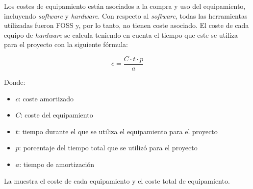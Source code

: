 Los costes de equipamiento están asociados a la compra y uso del equipamiento,
incluyendo \textit{software} y \textit{hardware}. Con respecto al
\textit{software}, todas las herramientas utilizadas fueron \gls{FOSS} y, por lo
tanto, no tienen coste asociado. El coste de cada equipo de \textit{hardware}
se calcula teniendo en cuenta el tiempo que este se utiliza para el proyecto con
la siguiente fórmula:

\begin{equation}\label{eq:chargeable-cost}
    c = \frac{C \cdot t \cdot p}{a}
\end{equation}

\noindent
Donde:

\begin{itemize}
    \item $c$: coste amortizado
    \item $C$: coste del equipamiento
    \item $t$: tiempo durante el que se utiliza el equipamiento para el proyecto
    \item $p$: porcentaje del tiempo total que se utilizó para el proyecto
    \item $a$: tiempo de amortización
\end{itemize}

\noindent
La  muestra el coste de cada equipamiento y el coste total
de equipamiento.


